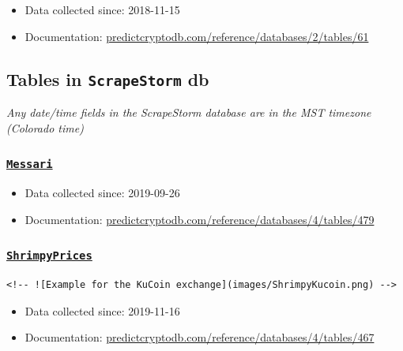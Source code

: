 \documentclass[
]{book}
\begin{document}
\begin{itemize}
\item
  Data collected since: 2018-11-15
\item
  Documentation: \href{https://predictcryptodb.com/reference/databases/2/tables/61}{predictcryptodb.com/reference/databases/2/tables/61}
\end{itemize}

\hypertarget{tables-in-scrapestorm-db}{%
\subsection{\texorpdfstring{Tables in \texttt{ScrapeStorm} db}{Tables in ScrapeStorm db}}\label{tables-in-scrapestorm-db}}

\emph{Any date/time fields in the ScrapeStorm database are in the MST timezone (Colorado time)}

\hypertarget{messari}{%
\subsubsection{\texorpdfstring{\href{https://predictcryptodb.com/question/15}{\textbf{\texttt{Messari}}}}{Messari}}\label{messari}}

\begin{itemize}
\item
  Data collected since: 2019-09-26
\item
  Documentation: \href{https://predictcryptodb.com/reference/databases/4/tables/479}{predictcryptodb.com/reference/databases/4/tables/479}
\end{itemize}

\hypertarget{shrimpyprices}{%
\subsubsection{\texorpdfstring{\href{https://predictcryptodb.com/question/8}{\textbf{\texttt{ShrimpyPrices}}}}{ShrimpyPrices}}\label{shrimpyprices}}

\begin{verbatim}
<!-- ![Example for the KuCoin exchange](images/ShrimpyKucoin.png) -->
\end{verbatim}

\begin{itemize}
\item
  Data collected since: 2019-11-16
\item
  Documentation: \href{https://predictcryptodb.com/reference/databases/4/tables/467}{predictcryptodb.com/reference/databases/4/tables/467}
\end{itemize}
\end{document}
